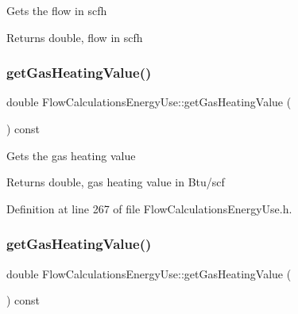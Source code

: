 Gets the flow in scfh

\begin{DoxyReturn}{Returns}
double, flow in scfh 
\end{DoxyReturn}
\mbox{\label{class_flow_calculations_energy_use_a42818c3f03cc70967eb6bb24094530a1}} 
\subsubsection{\texorpdfstring{get\+Gas\+Heating\+Value()}{getGasHeatingValue()}\hspace{0.1cm}{\footnotesize\ttfamily [1/3]}}
{\footnotesize\ttfamily double Flow\+Calculations\+Energy\+Use\+::get\+Gas\+Heating\+Value (\begin{DoxyParamCaption}{ }\end{DoxyParamCaption}) const\hspace{0.3cm}{\ttfamily [inline]}}

Gets the gas heating value

\begin{DoxyReturn}{Returns}
double, gas heating value in Btu/scf 
\end{DoxyReturn}


Definition at line 267 of file Flow\+Calculations\+Energy\+Use.\+h.

\mbox{\label{class_flow_calculations_energy_use_a42818c3f03cc70967eb6bb24094530a1}} 
\subsubsection{\texorpdfstring{get\+Gas\+Heating\+Value()}{getGasHeatingValue()}\hspace{0.1cm}{\footnotesize\ttfamily [2/3]}}
{\footnotesize\ttfamily double Flow\+Calculations\+Energy\+Use\+::get\+Gas\+Heating\+Value (\begin{DoxyParamCaption}{ }\end{DoxyParamCaption}) const\hspace{0.3cm}{\ttfamily [inline]}}

